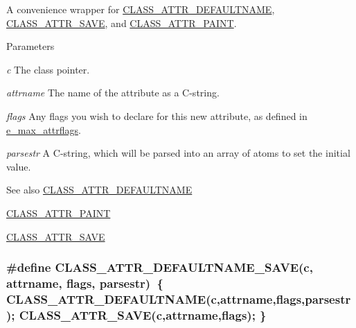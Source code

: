 A convenience wrapper for \hyperlink{group__attr_gaf6ee00a905a84d18172a212667cfa4cb}{CLASS\_\-ATTR\_\-DEFAULTNAME}, \hyperlink{group__attr_gaf56dc31d0defad3cdc1ee60b611acc79}{CLASS\_\-ATTR\_\-SAVE}, and \hyperlink{group__attr_gaee847156d2c156b4c9f73652b6059500}{CLASS\_\-ATTR\_\-PAINT}. 
\begin{DoxyParams}{Parameters}
\item[{\em c}]The class pointer. \item[{\em attrname}]The name of the attribute as a C-\/string. \item[{\em flags}]Any flags you wish to declare for this new attribute, as defined in \hyperlink{group__attr_gaf296cfc6741bb19207f6ed8062809115}{e\_\-max\_\-attrflags}. \item[{\em parsestr}]A C-\/string, which will be parsed into an array of atoms to set the initial value. \end{DoxyParams}
\begin{DoxySeeAlso}{See also}
\hyperlink{group__attr_gaf6ee00a905a84d18172a212667cfa4cb}{CLASS\_\-ATTR\_\-DEFAULTNAME} 

\hyperlink{group__attr_gaee847156d2c156b4c9f73652b6059500}{CLASS\_\-ATTR\_\-PAINT} 

\hyperlink{group__attr_gaf56dc31d0defad3cdc1ee60b611acc79}{CLASS\_\-ATTR\_\-SAVE} 
\end{DoxySeeAlso}
\hypertarget{group__attr_ga63ecd9c80a1897128996fb906550098c}{
\subsubsection[{CLASS\_\-ATTR\_\-DEFAULTNAME\_\-SAVE}]{\setlength{\rightskip}{0pt plus 5cm}\#define CLASS\_\-ATTR\_\-DEFAULTNAME\_\-SAVE(c, \/  attrname, \/  flags, \/  parsestr)~\{ CLASS\_\-ATTR\_\-DEFAULTNAME(c,attrname,flags,parsestr); CLASS\_\-ATTR\_\-SAVE(c,attrname,flags); \}}}
\label{group__attr_ga63ecd9c80a1897128996fb906550098c}


